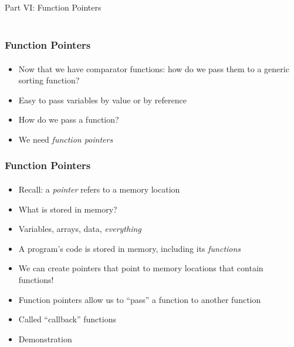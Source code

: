 \documentclass[]{beamer}
\begin{document}
\begin{frame}
    \frametitle{}
    \framesubtitle{}
    
    \begin{center}
    {\Huge Part VI: Function Pointers}\\
    {\Large ~}
    \end{center}

\end{frame}

\begin{frame}[fragile]
  \frametitle{Function Pointers}
  \framesubtitle{}

\begin{itemize}[<+->]
  \item Now that we have comparator functions: how do we pass them to a generic sorting function?
  \item Easy to pass variables by value or by reference
  \item How do we pass a function?
  \item We need \emph{function pointers}
\end{itemize}

\end{frame}

\begin{frame}[fragile]
  \frametitle{Function Pointers}
  \framesubtitle{}

\begin{itemize}[<+->]
  \item Recall: a \emph{pointer} refers to a memory location
  \item What is stored in memory? 
  \item Variables, arrays, data, \emph{everything}
  \item A program's code is stored in memory, including its \emph{functions}
  \item We can create pointers that point to memory locations that contain functions!
  \item Function pointers allow us to ``pass'' a function to another function
  \item Called ``callback'' functions
  \item Demonstration
\end{itemize}
\end{frame}
\end{document}

